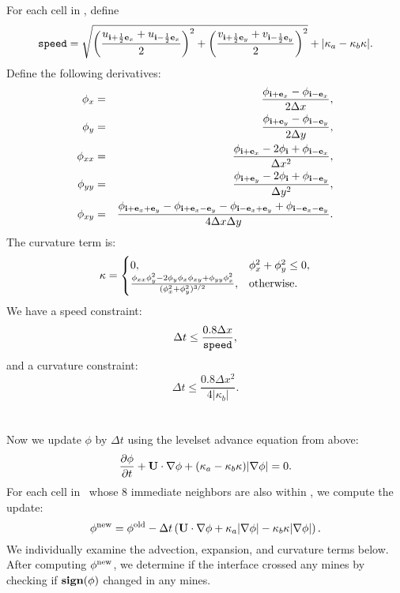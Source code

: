 \section{\LSCFL}
For each cell in \nband, define 
\begin{equation}
{\rm {\tt speed}} = \sqrt{\left(\frac{u_{{\bf i}+\frac{1}{2}{\bf e}_x}+u_{{\bf i}-\frac{1}{2}{\bf e}_x}}{2}\right)^2 + \left(\frac{v_{{\bf i}+\frac{1}{2}{\bf e}_y}+v_{{\bf i}-\frac{1}{2}{\bf e}_y}}{2}\right)^2} + |\kappa_a - \kappa_b\kappa|.
\end{equation}
Define the following derivatives:
\begin{eqnarray}
\phi_x &=& \frac{\phi_{{\bf i}+{\bf e}_x}-\phi_{{\bf i}-{\bf e}_x}}{2\Delta x}, \\
\phi_y &=& \frac{\phi_{{\bf i}+{\bf e}_y}-\phi_{{\bf i}-{\bf e}_y}}{2\Delta y}, \\
\phi_{xx} &=& \frac{\phi_{{\bf i}+{\bf e}_x}-2\phi_{{\bf i}}+\phi_{{\bf i}-{\bf e}_x}}{\Delta x^2}, \\
\phi_{yy} &=& \frac{\phi_{{\bf i}+{\bf e}_y}-2\phi_{{\bf i}}+\phi_{{\bf i}-{\bf e}_y}}{\Delta y^2}, \\
\phi_{xy} &=& \frac{\phi_{{\bf i}+{\bf e}_x+{\bf e}_y}-\phi_{{\bf i}+{\bf e}_x-{\bf e}_y}-\phi_{{\bf i}-{\bf e}_x+{\bf e}_y}+\phi_{{\bf i}-{\bf e}_x-{\bf e}_y}}{4\Delta x\Delta y}.
\end{eqnarray}
The curvature term is:
\begin{equation}
\kappa = 
\begin{cases}
0, & \phi_x^2+\phi_y^2 \le 0, \\
\frac{\phi_{xx}\phi_y^2 - 2\phi_y\phi_x\phi_{xy} + \phi_{yy}\phi_x^2}{(\phi_x^2 + \phi_y^2)^{3/2}}, & {\rm otherwise}. \\
\end{cases}
\end{equation}
We have a speed constraint:
\begin{equation}
\Delta t \le \frac{0.8\Delta x}{{\rm {\tt speed}}},
\end{equation}
and a curvature constraint:
\begin{equation}
\Delta t \le \frac{0.8\Delta x^2}{4|\kappa_b|}.
\end{equation}
\section{\PHIUPD}\label{Sec:PHIUPD}
Now we update $\phi$ by $\Delta t$ using the levelset advance equation from above:
\begin{equation}
\frac{\partial\phi}{\partial t} + {\bf U}\cdot\nabla\phi + (\kappa_a-\kappa_b\kappa)|\nabla\phi| = 0.
\end{equation}
For each cell in \nband~whose 8 immediate neighbors are also within \nband, we compute the update:
\begin{equation}
\phi^{\rm new} = \phi^{\rm old} - \Delta t\left({\bf U}\cdot\nabla\phi + \kappa_a|\nabla\phi| - \kappa_b\kappa|\nabla\phi|\right).
\end{equation}
We individually examine the advection, expansion, and curvature terms below.  After computing $\phi^{\rm new}$, we determine if the interface crossed any mines by checking if ${\tt{\bf sign}}(\phi)$ changed in any mines.
